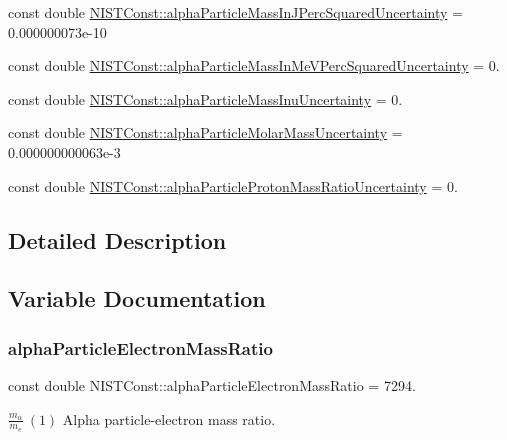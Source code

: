 \begin{DoxyCompactItemize}
const double \hyperlink{group___n_i_s_t_const-_alpha_ga198b93b4a36d33373d91234150ca0ead}{N\+I\+S\+T\+Const\+::alpha\+Particle\+Mass\+In\+J\+Perc\+Squared\+Uncertainty} = 0.\+000000073e-\/10
\item 
const double \hyperlink{group___n_i_s_t_const-_alpha_gab5e2063227c9f0ff40cda06ee27cb59d}{N\+I\+S\+T\+Const\+::alpha\+Particle\+Mass\+In\+Me\+V\+Perc\+Squared\+Uncertainty} = 0.
\item 
const double \hyperlink{group___n_i_s_t_const-_alpha_ga3638266ad988e036f097bea4ac0afba3}{N\+I\+S\+T\+Const\+::alpha\+Particle\+Mass\+Inu\+Uncertainty} = 0.
\item 
const double \hyperlink{group___n_i_s_t_const-_alpha_ga5f78e2dab7e63e1dd553c5e515dd6304}{N\+I\+S\+T\+Const\+::alpha\+Particle\+Molar\+Mass\+Uncertainty} = 0.\+000000000063e-\/3
\item 
const double \hyperlink{group___n_i_s_t_const-_alpha_gaf3dee14bcd671fad701d7bbd15f2de45}{N\+I\+S\+T\+Const\+::alpha\+Particle\+Proton\+Mass\+Ratio\+Uncertainty} = 0.
\end{DoxyCompactItemize}


\subsection{Detailed Description}


\subsection{Variable Documentation}
\mbox{\label{group___n_i_s_t_const-_alpha_ga9f00b32c60f1bc5b8a950b58e64d08c8}} 
\subsubsection{\texorpdfstring{alpha\+Particle\+Electron\+Mass\+Ratio}{alphaParticleElectronMassRatio}}
{\footnotesize\ttfamily const double N\+I\+S\+T\+Const\+::alpha\+Particle\+Electron\+Mass\+Ratio = 7294.}

$\frac{m_\alpha}{m_e} \ (1)$ Alpha particle-\/electron mass ratio. \mbox{\label{group___n_i_s_t_const-_alpha_gab0ff5a8444a405504f7bc319cc48561d}} 
